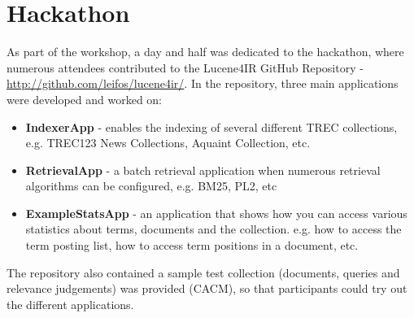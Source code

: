 \section{Hackathon}
As part of the workshop, a day and half was dedicated to the hackathon, where numerous attendees contributed to the Lucene4IR GitHub Repository - \url{http://github.com/leifos/lucene4ir/}. In the repository, three main applications were developed and worked on:
\begin{itemize}
	\item {\bf IndexerApp} - enables the indexing of several different TREC collections, e.g. TREC123 News Collections, Aquaint Collection, etc.
	\item {\bf RetrievalApp} - a batch retrieval application when numerous retrieval algorithms can be configured, e.g. BM25, PL2, etc
	\item {\bf ExampleStatsApp} - an application that shows how you can access various statistics about terms, documents and the collection. e.g. how to access the term posting list, how to access term positions in a document, etc.
	\end{itemize}

The repository also contained a sample test collection (documents, queries and relevance judgements) was provided (CACM), so that participants could try out the different applications.

